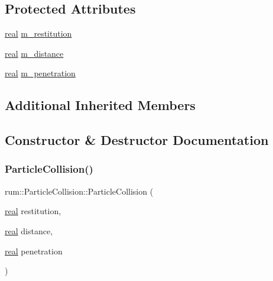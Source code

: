 \subsection*{Protected Attributes}
\begin{DoxyCompactItemize}
\item 
\mbox{\hyperlink{namespacerum_a7e8cca23573d5eaead0f138cbaa4862c}{real}} \mbox{\hyperlink{classrum_1_1_particle_collision_ae7aca9af657f5aea5e5e8c1261a51569}{m\+\_\+restitution}}
\item 
\mbox{\hyperlink{namespacerum_a7e8cca23573d5eaead0f138cbaa4862c}{real}} \mbox{\hyperlink{classrum_1_1_particle_collision_ae3b3e58675e2312ed3fe6a53c5882cc6}{m\+\_\+distance}}
\item 
\mbox{\hyperlink{namespacerum_a7e8cca23573d5eaead0f138cbaa4862c}{real}} \mbox{\hyperlink{classrum_1_1_particle_collision_a9ad398fd1a7b78e8ae8083610be60abb}{m\+\_\+penetration}}
\end{DoxyCompactItemize}
\subsection*{Additional Inherited Members}


\subsection{Constructor \& Destructor Documentation}
\mbox{\label{classrum_1_1_particle_collision_a56570896eab4c089fd3df8fa6e96454c}} 
\subsubsection{\texorpdfstring{Particle\+Collision()}{ParticleCollision()}}
{\footnotesize\ttfamily rum\+::\+Particle\+Collision\+::\+Particle\+Collision (\begin{DoxyParamCaption}\item[{\mbox{\hyperlink{namespacerum_a7e8cca23573d5eaead0f138cbaa4862c}{real}}}]{restitution,  }\item[{\mbox{\hyperlink{namespacerum_a7e8cca23573d5eaead0f138cbaa4862c}{real}}}]{distance,  }\item[{\mbox{\hyperlink{namespacerum_a7e8cca23573d5eaead0f138cbaa4862c}{real}}}]{penetration }\end{DoxyParamCaption})\hspace{0.3cm}{\ttfamily [explicit]}}

